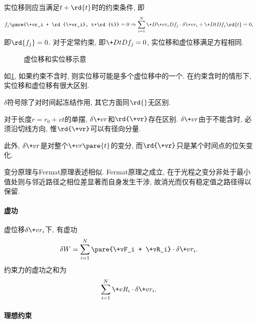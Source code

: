 \documentclass[../LectureNotes.tex]{subfiles}
\begin{document}
实位移则应当满足$t+\rd{t}$时的约束条件, 即
\[ f_j\pare{\+vr_i + \rd{\+vr_i}, t+\rd{t}} = 0 \Rightarrow \sum_{i=1}^N \+D{\+vr_i}D{f_j}\cdot\delta\+vr_i + \+DtD{f_j}\rd{t} = 0, \]
即$\rd{f_j} = 0$. 对于定常约束, 即$\displaystyle \+DtD{f_j} = 0$, 实位移和虚位移满足方程相同.
\begin{figure}[ht]
    \centering
    \caption{虚位移和实位移示意}
    \label{fig:虚位移和实位移示意}
\end{figure}
如\cref{fig:虚位移和实位移示意}, 如果约束不含时, 则实位移可能是多个虚位移中的一个. 在约束含时的情形下, 实位移和虚位移有很大区别.
\begin{finale}
    $\delta$符号除了对时间起冻结作用, 其它方面同$\rd{}$无区别.
\end{finale}
\begin{sample}
    \begin{ex}
        对于长度$r=r_0+vt$的单摆, $\delta \+vr$和$\rd{\+vr}$存在区别. $\delta \+vr$由于不能含时, 必须沿切线方向, 惟$\rd{\+vr}$可以有径向分量.
    \end{ex}
    \begin{remark}
        此外, $\delta \+vr$是对整个$\+vr\pare{t}$的变分, 而$\rd{\+vr}$只是某个时间点的位矢变化.
    \end{remark}
\end{sample}
\begin{remark}
    变分原理与Fermat原理表述相似. Fermat原理之成立, 在于光程之变分非处于最小值处则与邻近路径之相位差显著而自身发生干涉, 故消光而仅有稳定值之路径得以保留.
\end{remark}


\paragraph{虚功} %
\label{par:虚功}

虚位移$\delta\+vr_i$下, 有虚功
\[ \delta W = \sum_{i=1}^N\pare{\+vF_i + \+vR_i} \cdot\delta\+vr_i. \]
约束力的虚功之和为
\begin{equation}
    \label{eq:约束力的虚功之和}
    \sum_{i=1}^N \+vR_i\cdot\delta\+vr_i. 
\end{equation}


\paragraph{理想约束} %
\label{par:理想约束}
\end{document}

